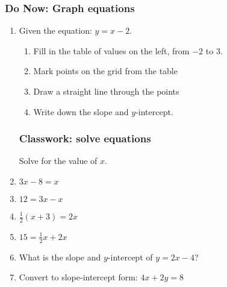 \documentclass[12pt, oneside]{article}
\begin{document}
\subsubsection*{Do Now: Graph equations}
  \vspace{0.5cm}

\begin{enumerate}
  \item   Given the equation: $y=x-2$.
  \begin{enumerate}
      \item Fill in the table of values on the left, from $-2$ to $3$.
      \item Mark points on the grid from the table
      \item Draw a straight line through the points
      \item Write down the slope and $y$-intercept. \vspace{3cm}

      \begin{center} %
      \end{center}

  \end{enumerate}


  \newpage
  \subsubsection*{Classwork: solve equations}
  Solve for the value of $x$.

  \item   $3x-8=x$ \vspace{3cm}
  \item   $12=3x-x$ \vspace{3cm}
  \item   $\frac{1}{2}(x+3)=2x$ \vspace{4cm}
  \item   $15=\frac{1}{2}x+2x$ \vspace{5cm}

  \item   What is the slope and $y$-intercept of $y=2x-4$?
    \vspace{2cm}
  \item   Convert to slope-intercept form: $4x+2y=8$ \vspace{3cm}


\end{enumerate}
\end{document}
